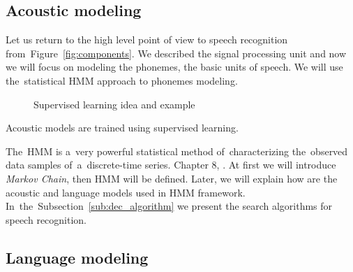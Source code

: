 {


\subsection{Acoustic modeling}
\label{sub:am}
Let us return to the high level point of view to speech recognition from~Figure~\ref{fig:components}.
We described the signal processing unit and now we will focus on modeling the phonemes, the basic
units of speech. We will use the~statistical \ac{HMM} approach to phonemes modeling.

\begin{figure}[!htp]
    \begin{center}
    
    
    \caption{Supervised learning idea and example}
    \label{fig:supervised} 
    \end{center}
\end{figure}

Acoustic models are trained using supervised learning. 

The~\ac{HMM} is a~very powerful statistical method of~characterizing the~observed data samples 
of~a~discrete-time series. Chapter 8, \cite{huang2001spoken}.
At first we will introduce {\it Markov Chain}, then \ac{HMM} will be defined. Later,  we will explain 
how are the acoustic and language models used in \ac{HMM} framework. 
In~the~Subsection~\ref{sub:dec_algorithm} we present the search algorithms for speech recognition.


% 


\subsection{Language modeling}
\label{sub:lm}

}

